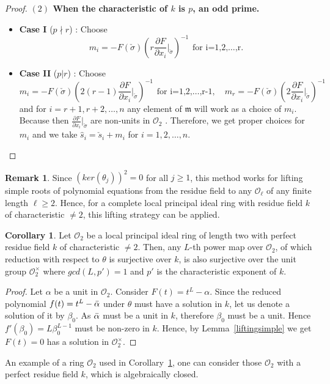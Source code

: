 \documentclass[10pt,twoside]{amsart}
\newcommand{\R}{\mathcal{O}_2}
\theoremstyle{definition}
\theoremstyle{definition}
\newtheorem{corollary}[theorem]{Corollary}
\newtheorem{remark}[theorem]{Remark}
\begin{document}
\begin{proof}
\noindent\textbf{$(2)$ When the characteristic of $k$ is $p$, an odd prime.} 

\begin{itemize}
\item \textbf{Case I} ($p\nmid r$) :
Choose $$m_i=-F(\check\sigma)\left(r\frac{\partial F}{\partial x_i}|_{\check\sigma} \right)^{-1} \hspace{5pt} \text{for i=1,2,\ldots,r}.$$ 
\item \textbf{Case II} ($p|r$) :
Choose $$m_i = -F(\check\sigma)\left(2(r-1) \frac{\partial F}{\partial x_i}|_{\check\sigma}\right)^{-1} \hspace{5pt} \text{for i=1,2,\ldots,r-1}, \quad m_r = -F(\check\sigma)\left(2\frac{\partial F}{\partial x_i}|_{\check\sigma}\right)^{-1}$$
and for $i=r+1, r+2, \ldots, n$ any element of $\mathfrak{m}$ will work as a choice of $m_i$.  Because then $\frac{\partial F}{\partial x_i}|_{\check\sigma}$ are non-units in $\R$ . Therefore, we get proper choices for $m_i$ and we take $\hat s_i=\check s_i+m_i$ for $i=1,2,\ldots,n$. 
\end{itemize}
\end{proof}

\begin{remark}{\label{rmk lifting}}
Since $(ker(\theta_j))^2=0$ for all $j\geq 1$, this method works for lifting simple roots of polynomial equations from the residue field to any $\mathcal{O}_{\ell}$ of any finite length $\ell\geq 2$. Hence, for a complete local principal ideal ring with residue field $k$ of characteristic $\neq 2$, this lifting strategy can be applied.
\end{remark}

\begin{corollary}\label{lift1}
Let $\R$ be a local principal ideal ring of length two with perfect residue field $k$ of characteristic $\neq 2$. Then, any $L$-th power map over $\R$, of which reduction with respect to $\theta$ is surjective over $k$, is also surjective over the unit group $\R^{\times}$ where $gcd(L, p')= 1$ and $p'$ is the characteristic exponent of $k$.
\end{corollary}
\begin{proof}
Let $\alpha$ be a unit in $\R$. Consider $F(t) = t^L - \alpha$. Since the reduced polynomial $f(t)=t^L-\Bar{\alpha}$ under $\theta$ must have a solution in $k$, let us denote a solution of it by $\beta_0$. As $\Bar{\alpha}$ must be a unit in $k$, therefore $\beta_0$ must be a unit. Hence $f'(\beta_0) = L \beta_0^{L-1}$ must be non-zero in $k$. Hence, by Lemma~\ref{liftingsimple} we get $F(t) = 0$ has a solution in $\R^{\times}$.
\end{proof}
\noindent An example of a ring $\R$ used in Corollary~\ref{lift1}, one can consider those $\R$ with a perfect residue field $k$, which is algebraically closed.
\end{document}
